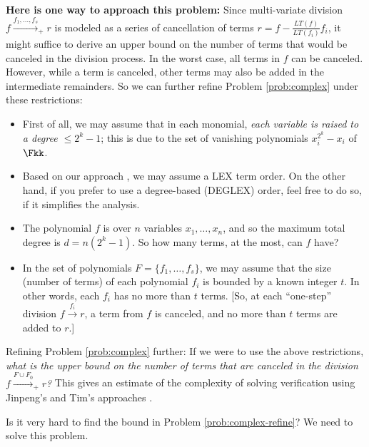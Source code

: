{\bf Here is one way to approach this problem:} 
Since multi-variate division $f\xrightarrow{f_1, \dots, f_s}_+ r$ is
modeled as a series of cancellation of terms $r = f -
\frac{LT(f)}{LT(f_i)} f_i$, it might suffice to derive an upper
bound on the number of terms that would be canceled in the division
process. In the worst case, all terms in $f$ can be
canceled. However, while a term is canceled, other terms may also
be added in the intermediate remainders. So we can further refine
Problem \ref{prob:complex} under these restrictions:

\begin{itemize}
\item First of all, we may assume that in each monomial, {\it each
  variable is raised to a degree  $\leq 2^k -1$}; this is due to the
  set of vanishing polynomials $x_i^{2^k}-x_i$ of $\Fkk$. 
\item Based on our approach \cite{lv:tcad2013}, we may assume a LEX
  term   order. On the other hand, if you prefer to use a degree-based
  (DEGLEX) order, feel free to do so, if it simplifies the analysis.
\item The polynomial $f$ is over $n$ variables $x_1, \dots, x_n$, and
  so the maximum total degree is $d = n(2^k - 1)$. So how many terms,
  at the most, can $f$ have? %
\item In the set of polynomials $F = \{f_1, \dots, f_s\}$, we may
  assume that the size (number of terms) of each polynomial $f_i$ is
  bounded by  a known integer $t$. In other words, each $f_i$ has no
  more than $t$ terms. [So, at each ``one-step'' division
    $f\xrightarrow{f_i} r$, a term from $f$ is canceled, and no
    more than $t$ terms are added to $r$.]
\end{itemize}

\begin{Problem}
\label{prob:complex-refine}
Refining Problem \ref{prob:complex} further: If we were to use the
above restrictions, {\it what is the upper bound   on the number of
  terms that are canceled in the division $f   \xrightarrow{F \cup
    F_0}_+ r$?} This gives an estimate of the complexity of
solving verification using Jinpeng's and Tim's approaches
\cite{lv:tcad2013} \cite{pruss:dac14}. 
\end{Problem}

Is it very hard to find the bound in Problem
\ref{prob:complex-refine}? We need to solve this problem.
